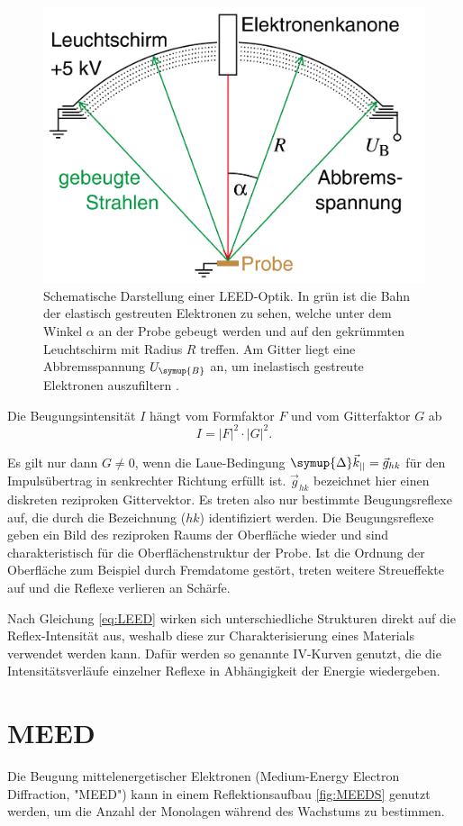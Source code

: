 \begin{figure}
        \centering
        \includegraphics[width=0.5\linewidth]{Plots/LEED_Schema.png}
        \caption{Schematische Darstellung einer LEED-Optik. In grün ist die Bahn der elastisch gestreuten Elektronen zu sehen,
        welche unter dem Winkel $\alpha$ an der Probe gebeugt werden und auf den gekrümmten Leuchtschirm mit Radius $R$ treffen.
        Am Gitter liegt eine Abbremsspannung $U_{\symup{B}}$ an, um inelastisch gestreute Elektronen auszufiltern \cite{fauster}.}
        \label{fig:LEED_Schema}
\end{figure}

Die Beugungsintensität $I$ hängt vom Formfaktor $F$ und vom Gitterfaktor $G$ ab
\begin{equation}
        I=|F|^2\cdot |G|^2.
        \label{eq:LEED}
\end{equation}

Es gilt nur dann $G\neq 0$, wenn die Laue-Bedingung $\symup{\Delta}\vec{k}_{||}=\vec{g}_{hk}$ für den Impulsübertrag in senkrechter Richtung erfüllt ist.
$\vec{g}_{hk}$ bezeichnet hier einen diskreten reziproken Gittervektor.
Es treten also nur bestimmte Beugungsreflexe auf, die durch die Bezeichnung ($hk$) identifiziert werden.
Die Beugungsreflexe geben ein Bild des reziproken Raums der Oberfläche wieder
und sind charakteristisch für die Oberflächenstruktur der Probe.
Ist die Ordnung der Oberfläche zum Beispiel durch Fremdatome gestört, treten weitere Streueffekte auf und
die Reflexe verlieren an Schärfe.

Nach Gleichung \ref{eq:LEED} wirken sich unterschiedliche Strukturen direkt auf die Reflex-Intensität aus, 
weshalb  diese zur Charakterisierung eines Materials verwendet werden kann.
Dafür werden so genannte IV-Kurven genutzt, die die Intensitätsverläufe einzelner Reflexe in Abhängigkeit der Energie 
wiedergeben.
\newpage

\section{MEED}
Die Beugung mittelenergetischer Elektronen (Medium-Energy Electron Diffraction, "MEED") kann in einem Reflektionsaufbau \ref{fig:MEEDS} 
genutzt werden, um die Anzahl der Monolagen während des Wachstums zu bestimmen.


